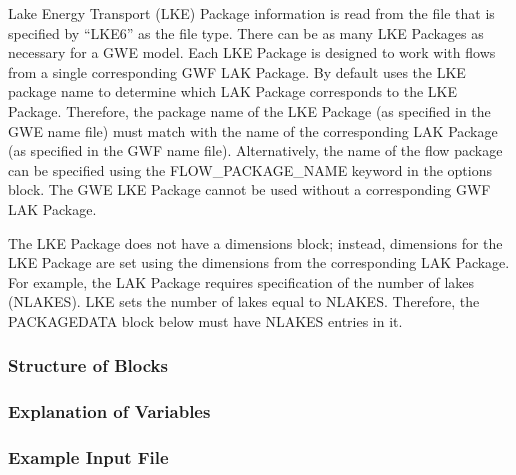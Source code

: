 Lake Energy Transport (LKE) Package information is read from the file that is specified by ``LKE6'' as the file type.  There can be as many LKE Packages as necessary for a GWE model. Each LKE Package is designed to work with flows from a single corresponding GWF LAK Package. By default \mf uses the LKE package name to determine which LAK Package corresponds to the LKE Package.  Therefore, the package name of the LKE Package (as specified in the GWE name file) must match with the name of the corresponding LAK Package (as specified in the GWF name file).  Alternatively, the name of the flow package can be specified using the FLOW\_PACKAGE\_NAME keyword in the options block.  The GWE LKE Package cannot be used without a corresponding GWF LAK Package.

The LKE Package does not have a dimensions block; instead, dimensions for the LKE Package are set using the dimensions from the corresponding LAK Package.  For example, the LAK Package requires specification of the number of lakes (NLAKES).  LKE sets the number of lakes equal to NLAKES.  Therefore, the PACKAGEDATA block below must have NLAKES entries in it.

\vspace{5mm}
\subsubsection{Structure of Blocks}




\vspace{5mm}
\subsubsection{Explanation of Variables}
\begin{description}

\end{description}

\vspace{5mm}
\subsubsection{Example Input File}


\vspace{5mm}
